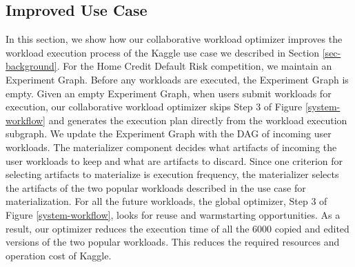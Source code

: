 \subsection{Improved Use Case}
In this section, we show how our collaborative workload optimizer improves the workload execution process of the Kaggle use case we described in Section \ref{sec-background}.
For the Home Credit Default Risk competition, we maintain an Experiment Graph.
Before any workloads are executed, the Experiment Graph is empty.
Given an empty Experiment Graph, when users submit workloads for execution, our collaborative workload optimizer skips Step 3 of Figure \ref{system-workflow} and generates the execution plan directly from the workload execution subgraph.
We update the Experiment Graph with the DAG of incoming user workloads.
The materializer component decides what artifacts of incoming the user workloads to keep and what are artifacts to discard.
Since one criterion for selecting artifacts to materialize is execution frequency, the materializer selects the artifacts of the two popular workloads described in the use case for materialization.
For all the future workloads, the global optimizer, Step 3 of Figure \ref{system-workflow}, looks for reuse and warmstarting opportunities. 
As a result, our optimizer reduces the execution time of all the 6000 copied and edited versions of the two popular workloads. 
This reduces the required resources and operation cost of Kaggle.
